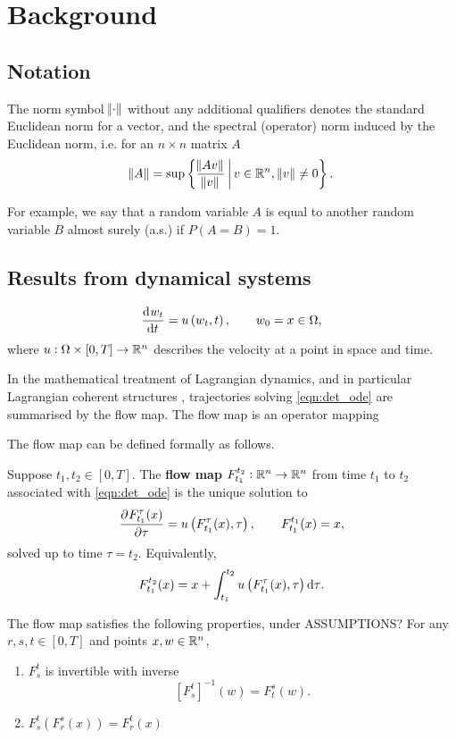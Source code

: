 
\chapter{Background}


\section{Notation}


The norm symbol \(\norm{\cdot}\) without any additional qualifiers denotes the standard Euclidean norm for a vector, and the spectral (operator) norm induced by the Euclidean norm, i.e. for an \(n \times n\) matrix \(A\)
\[
	\norm{A} = \sup\left\{\frac{\norm{Av}}{\norm{v}}\,\middle|\,v \in \mathbb{R}^n, \, \norm{v} \neq 0\right\}.
\]


For example, we say that a random variable \(A\) is equal to another random variable \(B\) almost surely (a.s.) if \(P\left(A = B\right) = 1\).




\section{Results from dynamical systems}
\begin{equation}
	\dod{w_t}{t} = u\left(w_t, t\right), \qquad w_0 = x \in \Omega,
	\label{eqn:det_ode}
\end{equation}
where \(u: \Omega \times[0,T] \to \mathbb{R}^n\) describes the velocity at a point in space and time.

In the mathematical treatment of Lagrangian dynamics, and in particular Lagrangian coherent structures \citep{BalasuriyaEtAl_2018_GeneralizedLagrangianCoherent}, trajectories solving \eqref{eqn:det_ode} are summarised by the flow map.
The flow map is an operator mapping

The flow map can be defined formally as follows.
\begin{definition}
	Suppose \(t_1, t_2 \in [0,T]\).
	The \textbf{flow map} \(F_{t_1}^{t_2}: \mathbb{R}^n \to \mathbb{R}^n\) from time \(t_1\) to \(t_2\) associated with \eqref{eqn:det_ode} is the unique solution to
	\begin{equation}
		\dpd{F_{t_1}^{\tau}(x)}{\tau} = u\left(F_{t_1}^\tau(x), \tau\right), \qquad F_{t_1}^{t_1}(x) = x,
		\label{eqn:flow_map_ode}
	\end{equation}
	solved up to time \(\tau = t_2\).
	Equivalently,
	\[
		F_{t_1}^{t_2}(x) = x + \int_{t_1}^{t_2}{u\left(F_{t_1}^\tau(x), \tau\right)\dif\tau}.
	\]
\end{definition}
The flow map satisfies the following properties, under ASSUMPTIONS? 
For any \(r, s, t \in [0,T]\) and points \(x,w \in \mathbb{R}^n\),
\begin{enumerate}
	\item \(F_{s}^{t}\) is invertible with inverse
		\[
			\left[F_{s}^{t}\right]^{-1}\left(w\right) = F_{t}^{s}\left(w\right).
		\]
	\item \(F_s^{t}\left(F_{r}^{s}(x)\right) = F_{r}^{t}\left(x\right)\) 
\end{enumerate}

